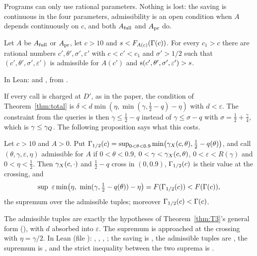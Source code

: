 Programs can only use rational parameters.  Nothing is lost: the saving is
continuous in the four parameters, admissibility is an open condition when
\(A\) depends continuously on \(c\), and both \(A_{\mathrm{full}}\) and \(A_{\mathrm{pr}}\) do.

\begin{proposition}\label{prop:rational}
Let \(A\) be \(A_{\mathrm{full}}\) or \(A_{\mathrm{pr}}\), let \(c>10\) and \(s<F_{A(c)}(\Gamma(c))\).
For every \(c_1>c\) there are rational numbers
\(c',\theta',\sigma',\varepsilon'\) with \(c<c'<c_1\) and \(\sigma'>1/2\) such
that \((c',\theta',\sigma',\varepsilon')\) is admissible for \(A(c')\) and
\(\operatorname{s}(c',\theta',\sigma',\varepsilon')>s\).
\end{proposition}

In Lean:  and
, from .

If every call is charged at \(D'\), as in the paper, the condition of
Theorem~\ref{thm:total} is \(\delta<d\min(\eta,\min(\gamma,\frac12-q)-\eta)\)
with \(d<\varepsilon\).  The constraint from the queries is then
\(\gamma\le\frac12-q\) instead of \(\gamma\le\sigma-q\) with
\(\sigma=\frac12+\frac\gamma4\), which is \(\gamma\le\gamma_{Q}\).  The following
proposition says what this costs.

\begin{proposition}\label{prop:half}
Let \(c>10\) and \(A>0\).  Put
\(\Gamma_{1/2}(c)=\sup_{0<\theta<0.9}\min\bigl(\gamma_{X}(c,\theta),\tfrac12-q(\theta)\bigr)\),
and call \((\theta,\gamma,\varepsilon,\eta)\) admissible for \(A\) if
\(0<\theta<0.9\), \(0<\gamma<\gamma_{X}(c,\theta)\), \(0<\varepsilon<R(\gamma)\) and
\(0<\eta<\frac12\).  Then \(\gamma_{X}(c,\cdot)\) and \(\frac12-q\) cross in
\((0,0.9)\), \(\Gamma_{1/2}(c)\) is their value at the crossing, and
\[
  \sup\ \varepsilon\min\bigl(\eta,\ \min(\gamma,\tfrac12-q(\theta))-\eta\bigr)
  =F(\Gam_{1/2}(c))<F(\Gam(c)),
\]
the supremum over the admissible tuples; moreover \(\Gamma_{1/2}(c)<\Gamma(c)\).
\end{proposition}

The admissible tuples are exactly the hypotheses of Theorem~\ref{thm:T3}'s
general form (), with \(d\) absorbed into
\(\varepsilon\).  The supremum is approached at the crossing with
\(\eta=\gamma/2\).  In Lean (file ):
, , ,
; the saving is , the admissible tuples
are , the supremum is , and the
strict inequality between the two suprema is .

